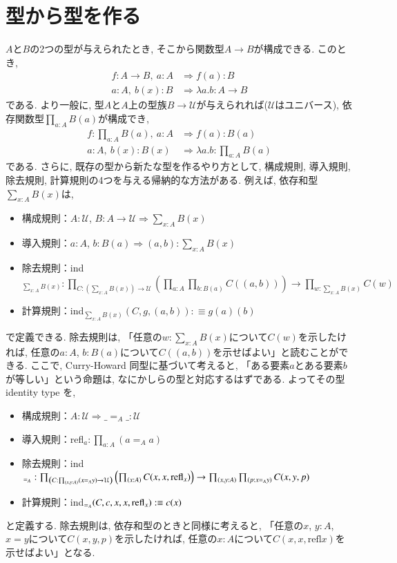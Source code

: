 \documentclass[11pt]{jsreport}
\theoremstyle{mystyle}
\newcommand{\Lra}{\Longrightarrow}
\newcommand{\U}{\mathcal{U}}
\newcommand{\refl}{\textrm{refl}}
\newcommand{\0}{\textbf{0}}
\begin{document}
\section{型から型を作る} \label{sec inductive}
$A$と$B$の2つの型が与えられたとき, そこから関数型$A \to B$が構成できる. このとき, 
\begin{align*}
  f : A \to B,\ a : A &\Lra f(a) : B \\
  a : A,\ b(x) : B &\Lra \lambda a. b : A \to B 
\end{align*}
である. より一般に, 型$A$と$A$上の型族$B \to \U$が与えられれば($\U$はユニバース), 依存関数型$\prod_{a : A} B(a)$が構成でき, 
\begin{align*}
  f :\prod_{a : A} B(a),\ a : A &\Lra f(a) : B(a) \\
  a : A,\ b(x) : B(x) &\Lra \lambda a. b : \prod_{a : A} B(a) 
\end{align*}
である. さらに, 既存の型から新たな型を作るやり方として, 構成規則, 導入規則, 除去規則, 計算規則の4つを与える帰納的な方法がある. 例えば, 依存和型$\sum_{x : A} B(x)$は, 
\begin{itemize}
  \item 構成規則：$A : \U$, $B : A \to \U \Lra \sum_{x : A} B(x)$
  \item 導入規則：$a : A$, $b : B(a) \Lra (a, b) : \sum_{x : A} B(x)$
  \item 除去規則：ind$_{\sum_{x : A} B(x)} : \prod_{C : (\sum_{x : A} B(x)) \to \U} 
                               \left(\prod_{a : A} \prod_{b : B(a)} C((a, b)) \right) \to 
                                      \prod_{w : \sum_{x : A} B(x)} C(w)$
  \item 計算規則：ind$_{\sum_{x : A} B(x)} (C, g, (a, b)) :\equiv g(a)(b)$
\end{itemize}
で定義できる. 除去規則は, 「任意の$w : \sum_{x : A} B(x)$について$C(w)$を示したければ, 任意の$a : A$, $b : B(a)$について$C((a, b))$を示せばよい」と読むことができる. 
ここで, Curry-Howard 同型に基づいて考えると, 「ある要素$a$とある要素$b$が等しい」という命題は, なにかしらの型と対応するはずである. よってその型 identity type を, 
\begin{itemize}
  \item 構成規則：$A : \U \Lra \_ =_A \_ : \U$
  \item 導入規則：refl$_a : \prod_{a : A} (a =_A a)$
  \item 除去規則：ind$_{=_A} : \prod_{\left( C : \prod_{(x, y : A)} (x =_A y) \to \U \right)} 
                                       \left( \prod_{(x : A)} C(x, x, {\rm refl}_x) \right) \to
                                       \prod_{(x, y : A)} \prod_{(p : x =_A y)} C(x, y, p)$
  \item 計算規則：ind$_{=_A} (C, c, x, x, {\rm refl}_x) : \equiv c(x)$
\end{itemize}
と定義する. 除去規則は, 依存和型のときと同様に考えると, 「任意の$x$, $y : A$, $x = y$について$C(x, y, p)$を示したければ, 任意の$x : A$について$C(x, x, \refl{x})$を示せばよい」となる. 
\end{document}
